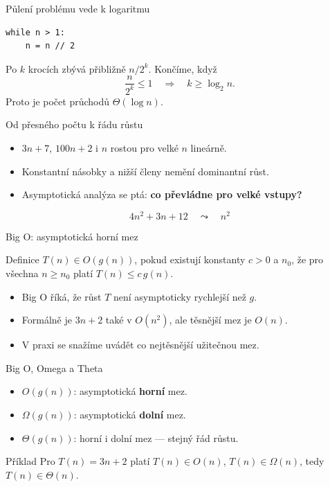\documentclass[aspectratio=169]{beamer}
\begin{document}
\begin{frame}[fragile]{Půlení problému vede k logaritmu}
\begin{lstlisting}[style=python]
while n > 1:
    n = n // 2
\end{lstlisting}
  Po \(k\) krocích zbývá přibližně \(n/2^k\). Končíme, když
  \[
    \frac{n}{2^k}\leq 1 \quad\Rightarrow\quad k\geq \log_2 n.
  \]
  Proto je počet průchodů \(\Theta(\log n)\).
\end{frame}

\begin{frame}{Od přesného počtu k řádu růstu}
  \begin{itemize}
    \item \(3n+7\), \(100n+2\) i \(n\) rostou pro velké \(n\) lineárně.
    \item Konstantní násobky a nižší členy nemění dominantní růst.
    \item Asymptotická analýza se ptá: \textbf{co převládne pro velké vstupy?}
  \end{itemize}
  \[
    4n^2+3n+12 \quad\leadsto\quad n^2
  \]
\end{frame}

\begin{frame}{Big O: asymptotická horní mez}
  \begin{block}{Definice}
    \(T(n)\in O(g(n))\), pokud existují konstanty \(c>0\) a \(n_0\), že pro všechna \(n\geq n_0\) platí \(T(n)\leq c\,g(n)\).
  \end{block}
  \begin{itemize}
    \item Big O říká, že růst \(T\) není asymptoticky rychlejší než \(g\).
    \item Formálně je \(3n+2\) také v \(O(n^2)\), ale těsnější mez je \(O(n)\).
    \item V praxi se snažíme uvádět co nejtěsnější užitečnou mez.
  \end{itemize}
\end{frame}

\begin{frame}{Big O, Omega a Theta}
  \begin{itemize}
    \item \(O(g(n))\): asymptotická \textbf{horní} mez.
    \item \(\Omega(g(n))\): asymptotická \textbf{dolní} mez.
    \item \(\Theta(g(n))\): horní i dolní mez --- stejný řád růstu.
  \end{itemize}
  \begin{block}{Příklad}
    Pro \(T(n)=3n+2\) platí \(T(n)\in O(n)\), \(T(n)\in\Omega(n)\), tedy \(T(n)\in\Theta(n)\).
  \end{block}
\end{frame}
\end{document}
